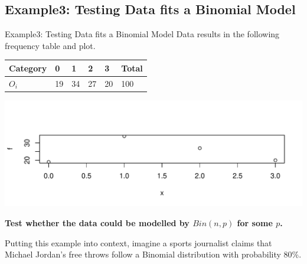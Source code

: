 \documentclass[t,xcolor=pdftex,dvipsnames,table]{beamer}\usepackage[]{graphicx}\usepackage[]{color}
\makeatletter
\def\maxwidth{ %
  \ifdim\Gin@nat@width>\linewidth
    \linewidth
  \else
    \Gin@nat@width
  \fi
}
\newenvironment{knitrout}{}{} %
\makeatother
\begin{document}
\subsection[GoodnessofFit]{Example3: Testing Data fits a Binomial Model}
\begin{frame}[fragile]{Example3: Testing Data fits a Binomial Model}
Data results in the following frequency table and plot. \\

\vspace{.5cm}
\begin{tabular}{l|lllll} 
Category & 0 & 1 & 2 & 3 & Total  \\ \hline
$O_{i}$ & 19 & 34 & 27 & 20 & 100    \\ \hline
\end{tabular}

\begin{knitrout}
\color{fgcolor}
\includegraphics[width=\maxwidth]{figure/unnamed-chunk-148-1} 

\end{knitrout}

{\bf Test whether the data could be modelled by $Bin(n,p)$ for some $p$.}
\end{frame}

\begin{frame}
Putting this example into context, imagine a sports journalist claims that Michael Jordan's free throws follow a Binomial distribution with probability 80\%.
\href{https://sahilmohnani.wordpress.com/tag/binomial/}{}
\href{https://www.youtube.com/watch?v=3lt1x-k3QGU}{}

\end{frame}
\end{document}
